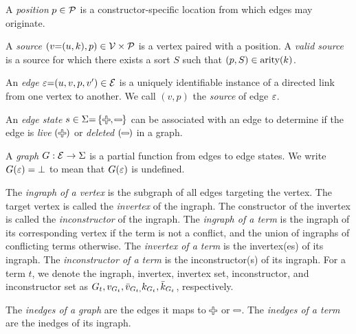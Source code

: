 \begin{definition}
  A \emph{position} $p \in \P$ is a constructor-specific location from which edges may originate.
\end{definition}

\begin{definition}
  A \emph{source} $(v{=}(u, k), p) \in \V \times \P$ is a vertex paired with a position.
  A \emph{valid source} is a source for which there exists a sort $S$ such that $(p, S) \in \arity{k}$.
\end{definition}

\begin{definition}
  An \emph{edge} $\e{=}(u, v, p, v^\prime) \in \E$ is a uniquely identifiable instance of a directed link from one vertex to another.
  We call $(v, p)$ the \emph{source} of edge $\e$.
\end{definition}

\begin{definition}
  An \emph{edge state} $s \in \Sigma{=}\SetOf{\Plus, \Minus}$
  can be associated with an edge to determine if the edge
  is \emph{live} $\left(\Plus\right)$
  or \emph{deleted} $\left(\Minus\right)$
  in a graph.
\end{definition}

\begin{definition}
  A \emph{graph} $G : \E \rightarrow \Sigma$ is a partial function from edges to edge states.
  We write $G(\e) = \bot$ to mean that $G(\e)$ is undefined.
\end{definition}

\begin{definition}
  The \emph{ingraph of a vertex} is the subgraph of all edges targeting the vertex.
  The target vertex is called the \emph{invertex} of the ingraph.
  The constructor of the invertex is called the \emph{inconstructor} of the ingraph.
  The \emph{ingraph of a term} is the ingraph of its corresponding vertex if the term is not a conflict,
  and the union of ingraphs of conflicting terms otherwise.
  The \emph{invertex of a term} is the invertex(es) of its ingraph.
  The \emph{inconstructor of a term} is the inconstructor(s) of its ingraph.
  For a term $t$, we denote the
    ingraph, invertex, invertex set, inconstructor, and inconstructor set
  as
    $G_t, v_{G_t}, \Q{v}_{G_t,} k_{G_t}, \Q{k}_{G_t}$,
  respectively.
\end{definition}

\begin{definition}
  The \emph{inedges of a graph} are the edges it maps to $\Plus$ or $\Minus$.
  The \emph{inedges of a term} are the inedges of its ingraph.
\end{definition}

